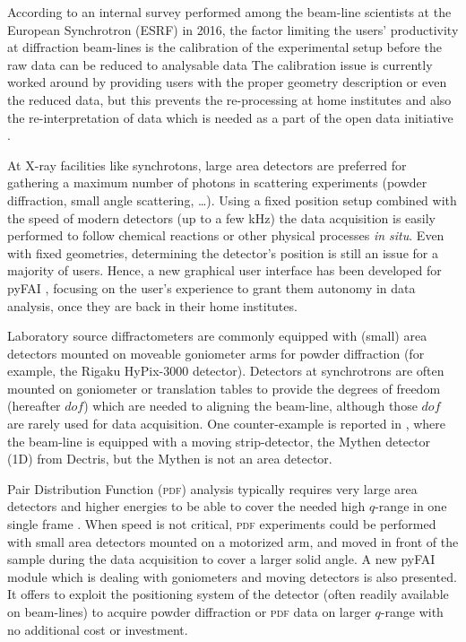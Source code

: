 \documentclass[preprint]{iucr}              %
\begin{document}
According to an internal survey performed among the beam-line scientists at
the European Synchrotron (ESRF) in 2016, the factor limiting the users'
productivity at diffraction beam-lines is the calibration of the experimental
setup before the raw data can be reduced to analysable data
The calibration issue is currently worked around by providing users with the
proper geometry description or even the reduced data, but this prevents the
re-processing at home institutes and also the re-interpretation of data which
is needed as a part of the open data initiative \cite{Wilkinson2016}.

At X-ray facilities like synchrotons, large area detectors are 
preferred for gathering a maximum number of photons in
scattering experiments (powder diffraction, small angle
scattering, \ldots).
Using a fixed position setup combined with the speed of modern detectors (up
to a few kHz) the data acquisition is easily
performed to follow chemical reactions or other physical processes \textit{in situ}.
Even with fixed geometries, determining the detector's position is
still an issue for a majority of users. 
Hence, a new graphical user interface has been developed for pyFAI
\cite{pyFAI_0.18}, focusing on the user's experience to grant them autonomy in
data analysis, once they are back in their home institutes.

Laboratory source diffractometers
are commonly equipped with (small) area detectors mounted on moveable goniometer
arms for powder diffraction (for example, the Rigaku HyPix-3000 detector).
Detectors at synchrotrons are often mounted on goniometer or
translation tables to provide the degrees of freedom (hereafter $dof$) which are 
needed to aligning the beam-line, although those $dof$ are rarely used for data acquisition.
One counter-example is reported in \cite{Gao:kc5032}, where the beam-line
is equipped with a moving strip-detector, the Mythen detector (1D) from Dectris,
but the Mythen is not an area detector.




Pair Distribution Function (\textsc{pdf}) analysis typically requires very large area
detectors and higher energies to be able to cover the needed high $q$-range in
one single frame \cite{Chupas:wf5000}.
When speed is not critical, \textsc{pdf} experiments could be performed
with small area detectors mounted on a motorized arm, and moved in front of
the sample during the data acquisition to cover a larger solid angle. 
A new pyFAI module which is dealing with goniometers and moving detectors is also presented.
It offers to exploit the positioning system of the detector 
(often readily available on beam-lines) to acquire powder diffraction or \textsc{pdf} data 
on larger $q$-range with no additional cost or investment.
\end{document}
